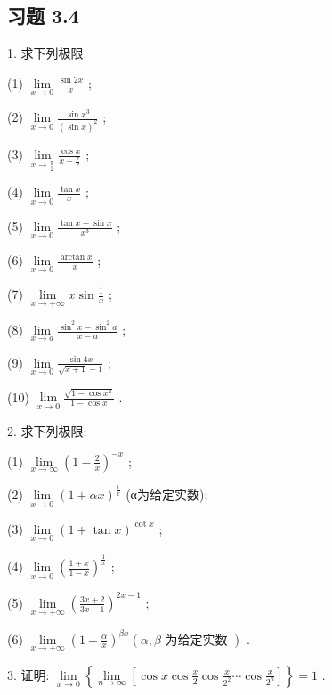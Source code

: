 \subsection{习题 3.4}

1. 求下列极限:

(1) \(\mathop{\lim }\limits_{{x \rightarrow  0}}\frac{\sin {2x}}{x}\) ;

(2) \(\mathop{\lim }\limits_{{x \rightarrow  0}}\frac{\sin {x}^{3}}{{\left( \sin x\right) }^{2}}\) ;

(3) \(\mathop{\lim }\limits_{{x \rightarrow  \frac{\pi }{2}}}\frac{\cos x}{x - \frac{\pi }{2}}\) ;

(4) \(\mathop{\lim }\limits_{{x \rightarrow  0}}\frac{\tan x}{x}\) ;

(5) \(\mathop{\lim }\limits_{{x \rightarrow  0}}\frac{\tan x - \sin x}{{x}^{3}}\) ;

(6) \(\mathop{\lim }\limits_{{x \rightarrow  0}}\frac{\arctan x}{x}\) ;

(7) \(\mathop{\lim }\limits_{{x \rightarrow   + \infty }}x\sin \frac{1}{x}\) ;

(8) \(\mathop{\lim }\limits_{{x \rightarrow  a}}\frac{{\sin }^{2}x - {\sin }^{2}a}{x - a}\) ;

(9) \(\mathop{\lim }\limits_{{x \rightarrow  0}}\frac{\sin {4x}}{\sqrt{x + 1} - 1}\) ;

(10) \(\mathop{\lim }\limits_{{x \rightarrow  0}}\frac{\sqrt{1 - \cos {x}^{2}}}{1 - \cos x}\) .

2. 求下列极限:

(1) \(\mathop{\lim }\limits_{{x \rightarrow  \infty }}{\left( 1 - \frac{2}{x}\right) }^{-x}\) ;

(2) \(\mathop{\lim }\limits_{{x \rightarrow  0}}{\left( 1 + \alpha x\right) }^{\frac{1}{x}}\) (α为给定实数);

(3) \(\mathop{\lim }\limits_{{x \rightarrow  0}}{\left( 1 + \tan x\right) }^{\cot x}\) ;

(4) \(\mathop{\lim }\limits_{{x \rightarrow  0}}{\left( \frac{1 + x}{1 - x}\right) }^{\frac{1}{x}}\) ;

(5) \(\mathop{\lim }\limits_{{x \rightarrow   + \infty }}{\left( \frac{{3x} + 2}{{3x} - 1}\right) }^{{2x} - 1}\) ;

(6) \(\mathop{\lim }\limits_{{x \rightarrow   + \infty }}{\left( 1 + \frac{\alpha }{x}\right) }^{\beta x}\left( {\alpha ,\beta \text{ 为给定实数 }}\right)\) .

3. 证明: \(\mathop{\lim }\limits_{{x \rightarrow  0}}\left\{  {\mathop{\lim }\limits_{{n \rightarrow  \infty }}\left\lbrack  {\cos x\cos \frac{x}{2}\cos \frac{x}{{2}^{2}}\cdots \cos \frac{x}{{2}^{n}}}\right\rbrack  }\right\}   = 1\) .


